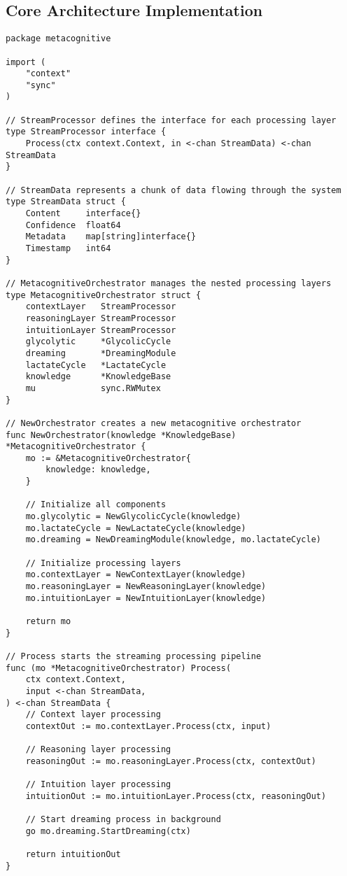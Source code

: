 \documentclass[11pt,a4paper,twocolumn]{article}
\begin{document}
\subsection{Core Architecture Implementation}

\begin{lstlisting}[caption={Core Architecture Implementation in Go}, label={lst:core}]
package metacognitive

import (
    "context"
    "sync"
)

// StreamProcessor defines the interface for each processing layer
type StreamProcessor interface {
    Process(ctx context.Context, in <-chan StreamData) <-chan StreamData
}

// StreamData represents a chunk of data flowing through the system
type StreamData struct {
    Content     interface{}
    Confidence  float64
    Metadata    map[string]interface{}
    Timestamp   int64
}

// MetacognitiveOrchestrator manages the nested processing layers
type MetacognitiveOrchestrator struct {
    contextLayer   StreamProcessor
    reasoningLayer StreamProcessor
    intuitionLayer StreamProcessor
    glycolytic     *GlycolicCycle
    dreaming       *DreamingModule
    lactateCycle   *LactateCycle
    knowledge      *KnowledgeBase
    mu             sync.RWMutex
}

// NewOrchestrator creates a new metacognitive orchestrator
func NewOrchestrator(knowledge *KnowledgeBase) *MetacognitiveOrchestrator {
    mo := &MetacognitiveOrchestrator{
        knowledge: knowledge,
    }
    
    // Initialize all components
    mo.glycolytic = NewGlycolicCycle(knowledge)
    mo.lactateCycle = NewLactateCycle(knowledge)
    mo.dreaming = NewDreamingModule(knowledge, mo.lactateCycle)
    
    // Initialize processing layers
    mo.contextLayer = NewContextLayer(knowledge)
    mo.reasoningLayer = NewReasoningLayer(knowledge)
    mo.intuitionLayer = NewIntuitionLayer(knowledge)
    
    return mo
}

// Process starts the streaming processing pipeline
func (mo *MetacognitiveOrchestrator) Process(
    ctx context.Context, 
    input <-chan StreamData,
) <-chan StreamData {
    // Context layer processing
    contextOut := mo.contextLayer.Process(ctx, input)
    
    // Reasoning layer processing
    reasoningOut := mo.reasoningLayer.Process(ctx, contextOut)
    
    // Intuition layer processing
    intuitionOut := mo.intuitionLayer.Process(ctx, reasoningOut)
    
    // Start dreaming process in background
    go mo.dreaming.StartDreaming(ctx)
    
    return intuitionOut
}
\end{lstlisting}
\end{document}
